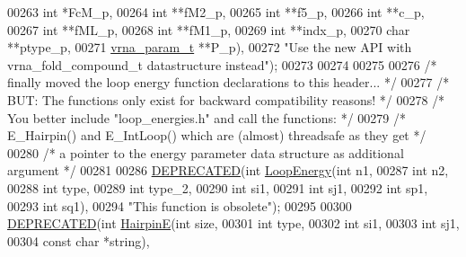 \begin{DoxyCode}
00263                             \textcolor{keywordtype}{int} *FcM\_p,
00264                             \textcolor{keywordtype}{int} **fM2\_p,
00265                             \textcolor{keywordtype}{int} **f5\_p,
00266                             \textcolor{keywordtype}{int} **c\_p,
00267                             \textcolor{keywordtype}{int} **fML\_p,
00268                             \textcolor{keywordtype}{int} **fM1\_p,
00269                             \textcolor{keywordtype}{int} **indx\_p,
00270                             \textcolor{keywordtype}{char} **ptype\_p,
00271                             \mbox{\hyperlink{group__energy__parameters_structvrna__param__s}{vrna\_param\_t}} **P\_p),
00272 \textcolor{stringliteral}{"Use the new API with vrna\_fold\_compound\_t datastructure instead"});
00273 
00274 
00275 
00276 \textcolor{comment}{/* finally moved the loop energy function declarations to this header...  */}
00277 \textcolor{comment}{/* BUT: The functions only exist for backward compatibility reasons!      */}
00278 \textcolor{comment}{/* You better include "loop\_energies.h" and call the functions:           */}
00279 \textcolor{comment}{/* E\_Hairpin() and E\_IntLoop() which are (almost) threadsafe as they get  */}
00280 \textcolor{comment}{/* a pointer to the energy parameter data structure as additional argument */}
00281 
00286 \mbox{\hyperlink{fold_8h_aab347a3c03fbe8e7319551b9fa0cce4a}{DEPRECATED}}(\textcolor{keywordtype}{int} \mbox{\hyperlink{group__mfe__fold__single_ga2163034a25c6115d894b199e97e03f6c}{LoopEnergy}}(\textcolor{keywordtype}{int} n1,
00287                           \textcolor{keywordtype}{int} n2,
00288                           \textcolor{keywordtype}{int} type,
00289                           \textcolor{keywordtype}{int} type\_2,
00290                           \textcolor{keywordtype}{int} si1,
00291                           \textcolor{keywordtype}{int} sj1,
00292                           \textcolor{keywordtype}{int} sp1,
00293                           \textcolor{keywordtype}{int} sq1),
00294 \textcolor{stringliteral}{"This function is obsolete"});
00295 
00300 \mbox{\hyperlink{fold_8h_aab347a3c03fbe8e7319551b9fa0cce4a}{DEPRECATED}}(\textcolor{keywordtype}{int} \mbox{\hyperlink{group__mfe__fold__single_gab327ce11972f5ac069d52c8dedfdb700}{HairpinE}}(\textcolor{keywordtype}{int} size,
00301                         \textcolor{keywordtype}{int} type,
00302                         \textcolor{keywordtype}{int} si1,
00303                         \textcolor{keywordtype}{int} sj1,
00304                         \textcolor{keyword}{const} \textcolor{keywordtype}{char} *\textcolor{keywordtype}{string}),

\end{DoxyCode}
